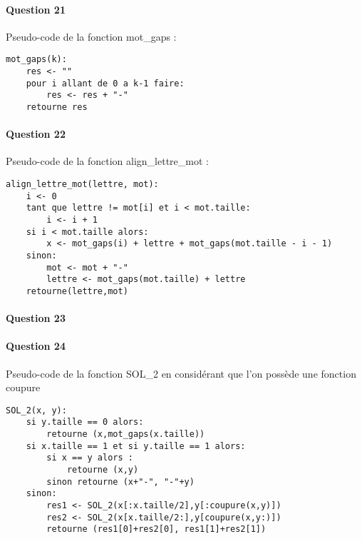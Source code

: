 
\paragraph{Question 21}
Pseudo-code de la fonction mot\_gaps :
\begin{lstlisting}
mot_gaps(k):
    res <- ""
    pour i allant de 0 a k-1 faire:
        res <- res + "-"
    retourne res
\end{lstlisting}
\paragraph{Question 22}
Pseudo-code de la fonction align\_lettre\_mot :
\begin{lstlisting}
align_lettre_mot(lettre, mot):
    i <- 0
    tant que lettre != mot[i] et i < mot.taille:
        i <- i + 1
    si i < mot.taille alors:
        x <- mot_gaps(i) + lettre + mot_gaps(mot.taille - i - 1)
    sinon:
        mot <- mot + "-"
        lettre <- mot_gaps(mot.taille) + lettre
    retourne(lettre,mot)

\end{lstlisting}

\paragraph{Question 23}
\paragraph{Question 24}
Pseudo-code de la fonction SOL\_2 en considérant que l'on possède une fonction coupure
\begin{lstlisting}
SOL_2(x, y):
    si y.taille == 0 alors:
        retourne (x,mot_gaps(x.taille))
    si x.taille == 1 et si y.taille == 1 alors:
        si x == y alors :
            retourne (x,y)
        sinon retourne (x+"-", "-"+y)
    sinon:
        res1 <- SOL_2(x[:x.taille/2],y[:coupure(x,y)])
        res2 <- SOL_2(x[x.taille/2:],y[coupure(x,y:)])
        retourne (res1[0]+res2[0], res1[1]+res2[1])
\end{lstlisting}
